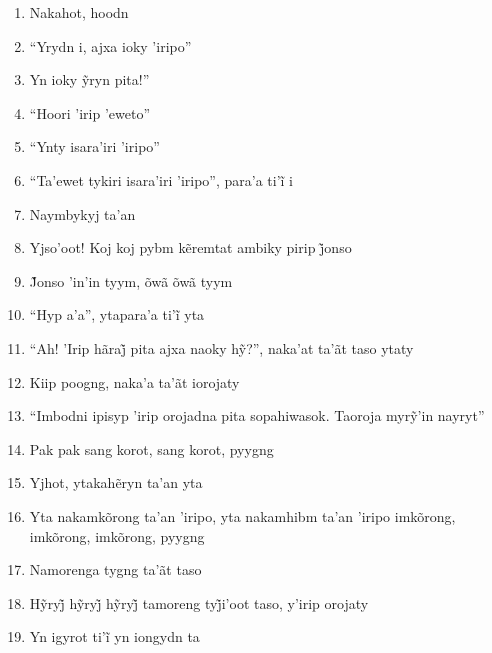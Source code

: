 \begin{enumerate}
 \item Nakahot, hoodn

 \item ``Yrydn i, ajxa ioky 'iripo''

 \item Yn ioky ỹryn pita!''

 \item ``Hoori 'irip 'eweto''

 \item ``Ynty isara'iri 'iripo''

 \item ``Ta’ewet tykiri isara’iri ’iripo'', para’a ti’ĩ i

 \begin{center}\end{center}

 \item Naymbykyj ta'an

 \item Yjso’oot! Koj koj pybm kẽremtat ambiky pirip j̃onso

 \item J̃onso ’in’in tyym, õwã õwã tyym

 \item ``Hyp a’a'', ytapara’a ti’ĩ yta

 \item ``Ah! ’Irip hãraj̃ pita ajxa naoky hỹ?'', naka’at ta’ãt taso ytaty

 \item Kiip poogng, naka'a ta'ãt iorojaty

 \item ``Imbodni ipisyp ’irip orojadna pita sopahiwasok. Taoroja myrỹ’in nayryt''

 \item Pak pak sang korot, sang korot, pyygng

 \item Yjhot, ytakahẽryn ta’an yta

 \item Yta nakamkõrong ta'an 'iripo, yta nakamhibm ta'an 'iripo imkõrong,
 imkõrong, imkõrong, pyygng

 \item Namorenga tygng ta'ãt taso

 \item Hỹryj̃ hỹryj̃ hỹryj̃ tamoreng tyj̃i’oot taso, y’irip orojaty

 \item Yn igyrot ti’ĩ yn iongydn ta

 \begin{center}\end{center}


\end{enumerate}
